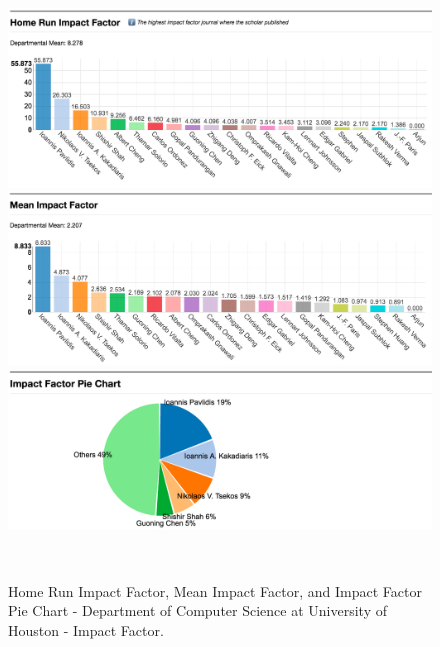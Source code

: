\begin{figure}
  \centering
  \includegraphics[width=1\textwidth]{figures/Dept-IF-HD}
  \includegraphics[width=1\textwidth]{figures/Dept-IF-HD2}
  \includegraphics[width=1\textwidth]{figures/Dept-IF-HD3}
  \caption{Home Run Impact Factor, Mean Impact Factor, and Impact Factor Pie Chart - Department of Computer Science at University of Houston - Impact Factor.}~\label{fig:DP-College1}
\end{figure}

